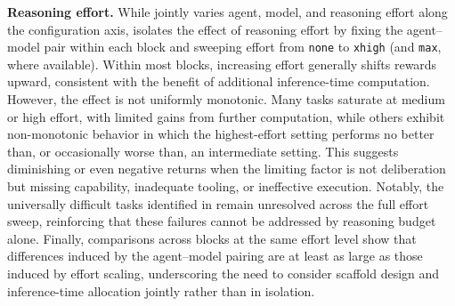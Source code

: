 \noindent\textbf{Reasoning effort.}
While  jointly varies agent, model, and reasoning effort along the configuration axis,  isolates the effect of reasoning effort by fixing the agent--model pair within each block and sweeping effort from \texttt{none} to \texttt{xhigh} (and \texttt{max}, where available). Within most blocks, increasing effort generally shifts rewards upward, consistent with the benefit of additional inference-time computation. However, the effect is not uniformly monotonic. Many tasks saturate at medium or high effort, with limited gains from further computation, while others exhibit non-monotonic behavior in which the highest-effort setting performs no better than, or occasionally worse than, an intermediate setting. This suggests diminishing or even negative returns when the limiting factor is not deliberation but missing capability, inadequate tooling, or ineffective execution. Notably, the universally difficult tasks identified in  remain unresolved across the full effort sweep, reinforcing that these failures cannot be addressed by reasoning budget alone. Finally, comparisons across blocks at the same effort level show that differences induced by the agent--model pairing are at least as large as those induced by effort scaling, underscoring the need to consider scaffold design and inference-time allocation jointly rather than in isolation.



